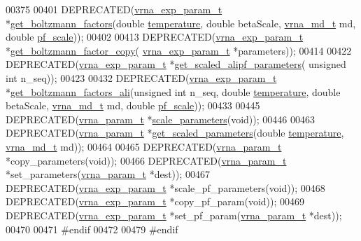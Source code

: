 \begin{DoxyCode}
00375 
00401 DEPRECATED(\hyperlink{group__energy__parameters_structvrna__exp__param__s}{vrna\_exp\_param\_t} *\hyperlink{group__energy__parameters_gaef2b931c7e9d4ffb0a5c33df50ec2068}{get\_boltzmann\_factors}(\textcolor{keywordtype}{double} 
      \hyperlink{group__energy__parameters_aeed2cd83713012bcb52e431041e037c8}{temperature}, \textcolor{keywordtype}{double} betaScale, \hyperlink{structvrna__md__s}{vrna\_md\_t} md, \textcolor{keywordtype}{double} \hyperlink{group__model__details_gad3b22044065acc6dee0af68931b52cfd}{pf\_scale}));
00402 
00413 DEPRECATED(\hyperlink{group__energy__parameters_structvrna__exp__param__s}{vrna\_exp\_param\_t} *\hyperlink{group__energy__parameters_ga665a446ba8ff211e551297a8fa36ec27}{get\_boltzmann\_factor\_copy}(
      \hyperlink{group__energy__parameters_structvrna__exp__param__s}{vrna\_exp\_param\_t} *parameters));
00414 
00422 DEPRECATED(\hyperlink{group__energy__parameters_structvrna__exp__param__s}{vrna\_exp\_param\_t} *\hyperlink{group__energy__parameters_ga0ccf4e1be085a573533fd6b9da2d8cf9}{get\_scaled\_alipf\_parameters}(\textcolor{keywordtype}{
      unsigned} \textcolor{keywordtype}{int} n\_seq));
00423 
00432 DEPRECATED(\hyperlink{group__energy__parameters_structvrna__exp__param__s}{vrna\_exp\_param\_t} *\hyperlink{group__energy__parameters_ga2aa1d87c97f35d2e4121634a17556829}{get\_boltzmann\_factors\_ali}(\textcolor{keywordtype}{unsigned} \textcolor{keywordtype}{
      int} n\_seq, \textcolor{keywordtype}{double} \hyperlink{group__energy__parameters_aeed2cd83713012bcb52e431041e037c8}{temperature}, \textcolor{keywordtype}{double} betaScale, \hyperlink{structvrna__md__s}{vrna\_md\_t} md, \textcolor{keywordtype}{double} 
      \hyperlink{group__model__details_gad3b22044065acc6dee0af68931b52cfd}{pf\_scale}));
00433 
00445 DEPRECATED(\hyperlink{group__energy__parameters_structvrna__param__s}{vrna\_param\_t} *\hyperlink{group__energy__parameters_ga541f2cf7436e9bc939b0a49b24baf987}{scale\_parameters}(\textcolor{keywordtype}{void}));
00446 
00463 DEPRECATED(\hyperlink{group__energy__parameters_structvrna__param__s}{vrna\_param\_t} *\hyperlink{group__energy__parameters_ga7fa6a000d7c16feab939f2c4ee626197}{get\_scaled\_parameters}(\textcolor{keywordtype}{double} 
      \hyperlink{group__energy__parameters_aeed2cd83713012bcb52e431041e037c8}{temperature}, \hyperlink{structvrna__md__s}{vrna\_md\_t} md));
00464 
00465 DEPRECATED(\hyperlink{group__energy__parameters_structvrna__param__s}{vrna\_param\_t}     *copy\_parameters(\textcolor{keywordtype}{void}));
00466 DEPRECATED(\hyperlink{group__energy__parameters_structvrna__param__s}{vrna\_param\_t}     *set\_parameters(\hyperlink{group__energy__parameters_structvrna__param__s}{vrna\_param\_t} *dest));
00467 DEPRECATED(\hyperlink{group__energy__parameters_structvrna__exp__param__s}{vrna\_exp\_param\_t} *scale\_pf\_parameters(\textcolor{keywordtype}{void}));
00468 DEPRECATED(\hyperlink{group__energy__parameters_structvrna__exp__param__s}{vrna\_exp\_param\_t} *copy\_pf\_param(\textcolor{keywordtype}{void}));
00469 DEPRECATED(\hyperlink{group__energy__parameters_structvrna__exp__param__s}{vrna\_exp\_param\_t} *set\_pf\_param(\hyperlink{group__energy__parameters_structvrna__param__s}{vrna\_param\_t} *dest));
00470 
00471 \textcolor{preprocessor}{#endif}
00472 
00479 \textcolor{preprocessor}{#endif}
\end{DoxyCode}
